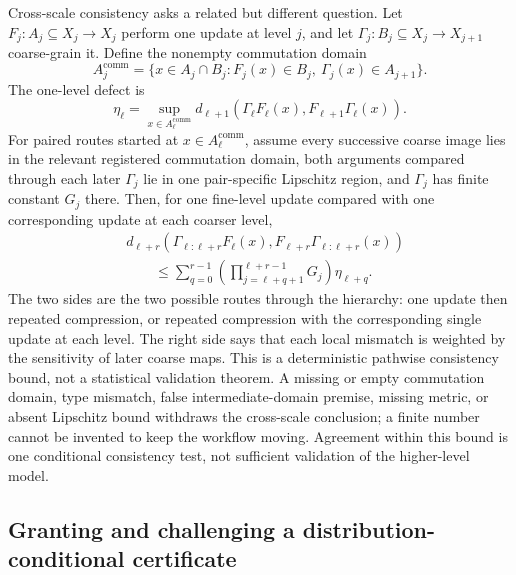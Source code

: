 \documentclass[10pt]{article}
\theoremstyle{definition}
\begin{document}
Cross-scale consistency asks a related but different question. Let
\(F_j:A_j\subseteq X_j\to X_j\) perform one update at level \(j\), and let
\(\Gamma_j:B_j\subseteq X_j\to X_{j+1}\) coarse-grain it.
Define the nonempty commutation domain
\[
A_j^{\mathrm{comm}}=\{x\in A_j\cap B_j:
F_j(x)\in B_j,\ \Gamma_j(x)\in A_{j+1}\}.
\]
The one-level defect is
\[
\eta_\ell=\sup_{x\in A_\ell^{\mathrm{comm}}}
d_{\ell+1}(\Gamma_\ell F_\ell(x),F_{\ell+1}\Gamma_\ell(x)).
\]
For paired routes started at \(x\in A_\ell^{\mathrm{comm}}\), assume every successive coarse image
lies in the relevant registered commutation domain, both arguments compared through each later \(\Gamma_j\) lie in
one pair-specific Lipschitz region, and \(\Gamma_j\) has finite constant \(G_j\) there. Then, for
one fine-level update compared with one corresponding update at each coarser level,
\begin{equation}
\begin{split}
&d_{\ell+r}\!\left(
\Gamma_{\ell:\ell+r}F_\ell(x),
F_{\ell+r}\Gamma_{\ell:\ell+r}(x)
\right)\\
&\qquad\le
\sum_{q=0}^{r-1}
\left(\prod_{j=\ell+q+1}^{\ell+r-1}G_j\right)\eta_{\ell+q}.
\end{split}
\label{eq:cross}
\end{equation}
The two sides are the two possible routes through the hierarchy: one update then repeated
compression, or repeated compression with the corresponding single update at each level. The
right side says that each local mismatch is weighted by the sensitivity of later coarse maps. This
is a deterministic pathwise consistency bound, not a statistical validation theorem. A missing or
empty commutation domain, type mismatch, false intermediate-domain premise, missing metric, or absent
Lipschitz bound withdraws the cross-scale conclusion; a finite number cannot be invented to keep
the workflow moving. Agreement within this bound is one conditional consistency test, not
sufficient validation of the higher-level model.

\subsection{Granting and challenging a distribution-conditional certificate}
\end{document}
